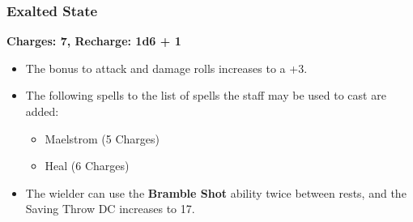 {\subsubsection*{Exalted State}
\textbf{Charges: 7, Recharge: 1d6 + 1}
\begin{itemize}
	\item The bonus to attack and damage rolls increases to a +3.
	\item The following spells to the list of spells the staff may be used to cast are added:
	\begin{itemize}
		\item Maelstrom (5 Charges)
		\item Heal (6 Charges)
	\end{itemize}
	\item The wielder can use the \textbf{Bramble Shot} ability twice between rests, and the Saving Throw DC increases to 17.
\end{itemize}}